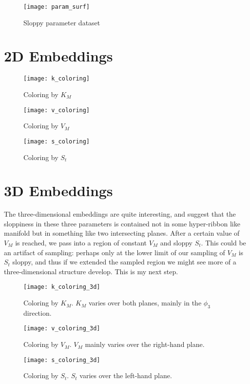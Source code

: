 \documentclass[11pt]{article}
\begin{document}
\begin{figure}[htbp]
  \centering
  \texttt{[image: param\_surf]}
  \caption{Sloppy parameter dataset}
  \label{fig:K}
\end{figure}

\clearpage

\section*{2D Embeddings}

\begin{figure}[htbp]
  \centering
  \texttt{[image: k\_coloring]}
  \caption{Coloring by $K_M$}
  \label{fig:K}
\end{figure}

\begin{figure}[htbp]
  \centering
  \texttt{[image: v\_coloring]}
  \caption{Coloring by $V_M$}
  \label{fig:V}
\end{figure}

\begin{figure}[htbp]
  \centering
  \texttt{[image: s\_coloring]}
  \caption{Coloring by $S_t$}
  \label{fig:S}
\end{figure}

\clearpage

\section*{3D Embeddings}

The three-dimensional embeddings are quite interesting, and suggest that the sloppiness in these three parameters is contained not in some hyper-ribbon like manifold but in something like two intersecting planes. After a certain value of $V_M$ is reached, we pass into a region of constant $V_M$ and sloppy $S_t$. This could be an artifact of sampling: perhaps only at the lower limit of our sampling of $V_M$ is $S_t$ sloppy, and thus if we extended the sampled region we might see more of a three-dimensional structure develop. This is my next step.

\begin{figure}[htbp]
  \centering
  \texttt{[image: k\_coloring\_3d]}
  \caption{Coloring by $K_M$. $K_M$ varies over both planes, mainly in the $\phi_3$ direction.}
  \label{fig:K}
\end{figure}

\begin{figure}[htbp]
  \centering
  \texttt{[image: v\_coloring\_3d]}
  \caption{Coloring by $V_M$. $V_M$ mainly varies over the right-hand plane.}
  \label{fig:V}
\end{figure}

\begin{figure}[htbp]
  \centering
  \texttt{[image: s\_coloring\_3d]}
  \caption{Coloring by $S_t$. $S_t$ varies over the left-hand plane.}
  \label{fig:S}
\end{figure}

% 
% 
\end{document}
